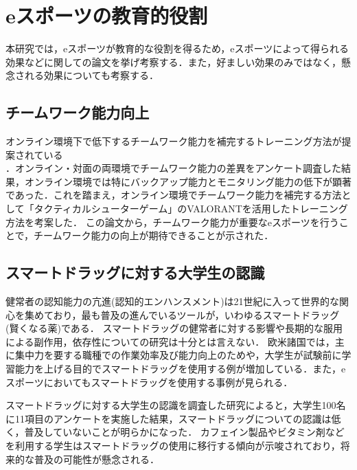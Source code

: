 \section{eスポーツの教育的役割}

本研究では，eスポーツが教育的な役割を得るため，eスポーツによって得られる効果などに関しての論文を挙げ考察する．また，好ましい効果のみではなく，懸念される効果についても考察する．

\subsection{チームワーク能力向上}

オンライン環境下で低下するチームワーク能力を補完するトレーニング方法が提案されている\cite{Fukuyasu2020}\\．オンライン・対面の両環境でチームワーク能力の差異をアンケート調査した結果，オンライン環境では特にバックアップ能力とモニタリング能力の低下が顕著であった．これを踏まえ，オンライン環境でチームワーク能力を補完する方法として「タクティカルシューターゲーム」のVALORANTを活用したトレーニング方法を考案した．%
この論文から，チームワーク能力が重要なeスポーツを行うことで，チームワーク能力の向上が期待できることが示された．

\subsection{スマートドラッグに対する大学生の認識}

健常者の認知能力の亢進(認知的エンハンスメント)は21世紀に入って世界的な関心を集めており，最も普及の進んでいるツールが，いわゆるスマートドラッグ(賢くなる薬)である．%
スマートドラッグの健常者に対する影響や長期的な服用による副作用，依存性についての研究は十分とは言えない．%
欧米諸国では，主に集中力を要する職種での作業効率及び能力向上のためや，大学生が試験前に学習能力を上げる目的でスマートドラッグを使用する例が増加している．また，eスポーツにおいてもスマートドラッグを使用する事例が見られる．

スマートドラッグに対する大学生の認識を調査した研究によると\cite{published_papers/16690353}，大学生100名に11項目のアンケートを実施した結果，スマートドラッグについての認識は低く，普及していないことが明らかになった．%
カフェイン製品やビタミン剤などを利用する学生はスマートドラッグの使用に移行する傾向が示唆されており，将来的な普及の可能性が懸念される．

